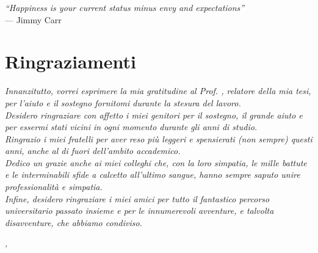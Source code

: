 \cleardoublepage
{}
{}

\begin{flushright}{
        \slshape
        ``Happiness is your current status minus envy and expectations''} \\
    \medskip
    --- Jimmy Carr
\end{flushright}


\bigskip

\begingroup
\let\clearpage\relax
\let\cleardoublepage\relax
\let\cleardoublepage\relax

\chapter*{Ringraziamenti}

\noindent \textit{Innanzitutto, vorrei esprimere la mia gratitudine al Prof. \myProf, relatore della mia tesi, per l'aiuto e il sostegno fornitomi durante la stesura del lavoro.}\\

\noindent \textit{Desidero ringraziare con affetto i miei genitori per il sostegno, il grande aiuto e per essermi stati vicini in ogni momento durante gli anni di studio.}\\

\noindent \textit{Ringrazio i miei fratelli per aver reso più leggeri e spensierati (non sempre) questi anni, anche al di fuori dell'ambito accademico.}\\

\noindent \textit{Dedico un grazie anche ai miei colleghi che, con la loro simpatia, le mille battute e le interminabili sfide a calcetto all'ultimo sangue, hanno sempre saputo unire professionalità e simpatia.}\\

\noindent \textit{Infine, desidero ringraziare i miei amici per tutto il fantastico percorso universitario passato insieme e per le innumerevoli avventure, e talvolta disavventure, che abbiamo condiviso.}\\
\bigskip

\noindent\textit{\myLocation, \myTime}
\hfill \myName

\endgroup
